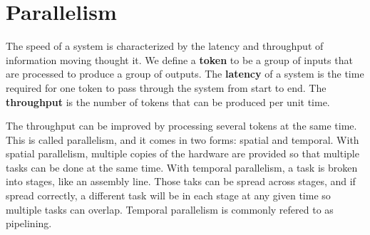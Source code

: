 \section{Parallelism}

The speed of a system is characterized by the latency and throughput of information moving thought it.
We define a \textbf{token} to be a group of inputs that are processed to produce a group of outputs. 
The \textbf{latency} of a system is the time required for one token to pass through the system from 
start to end. The \textbf{throughput} is the number of tokens that can be produced per unit time.


The throughput can be improved by processing several tokens at the same time. This is called 
parallelism, and it comes in two forms: spatial and temporal. With spatial parallelism, multiple 
copies of the hardware are provided so that multiple tasks can be done at the same time. With 
temporal parallelism, a task is broken into stages, like an assembly line. Those taks can be spread 
across stages, and if spread correctly, a different task will be in each stage at any given time so 
multiple tasks can overlap. Temporal parallelism is commonly refered to as pipelining.